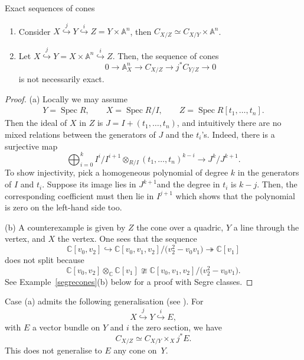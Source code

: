 \documentclass[pdftex]{sigma}
\numberwithin{equation}{section}
\newcommand{\Spec}{\operatorname{Spec}}
\theoremstyle{plain}
\theoremstyle{definition}
\theoremstyle{remark}
\begin{document}
\begin{Example}Exact sequences of cones
\begin{enumerate}\itemsep=0pt
\item[(a)] Consider $X\overset{j}{\hookrightarrow} Y \overset{i}{\hookrightarrow} Z=Y\times\mathbb A^n$, then $C_{X/Z}\simeq C_{X/Y}\times\mathbb A^n$.
\item[(b)] Let $X\overset{j}{\hookrightarrow} Y=X\times\mathbb A^n \overset{i}{\hookrightarrow} Z$. Then, the sequence of cones
\[0\to\mathbb A^n_X\to C_{X/Z}\to j^*C_{Y/Z}\to 0
\] is not necessarily exact.
\end{enumerate}
\end{Example}

\begin{proof}
(a) Locally we may assume
\begin{gather*}Y=\Spec R,\qquad X=\Spec R/I,\qquad Z=\Spec R[t_1,\ldots,t_n].
\end{gather*} Then the ideal of $X$ in $Z$ is $J=I+(t_1,\ldots,t_n)$, and intuitively there are no mixed relations between the generators of $J$ and the $t_i$'s. Indeed, there is a surjective map
\[
 \bigoplus_{i=0}^k I^i/I^{i+1}\otimes_{R/I} (t_1,\ldots,t_n)^{k-i}\to J^k/J^{k+1}.
\]
To show injectivity, pick a homogeneous polynomial of degree $k$ in the generators of $I$ and $t_i$. Suppose its image lies in $J^{k+1}$and the degree in $t_i$ is $k-j$. Then, the corresponding coefficient must then lie in $I^{j+1}$ which shows that the polynomial is zero on the left-hand side too.

(b) A counterexample is given by $Z$ the cone over a quadric, $Y$ a line through the vertex, and $X$ the vertex. One sees that the sequence
\[\mathbb C[v_0,v_2]\hookrightarrow \mathbb C[v_0,v_1,v_2]/\big(v_2^2-v_0v_1\big)\twoheadrightarrow\mathbb C[v_1]\]
does not split because
\[\mathbb C[v_0,v_2]\otimes_{\mathbb C}\mathbb C[v_1]\ncong \mathbb C[v_0,v_1,v_2]/\big(v_2^2-v_0v_1\big).\]
See Example~\ref{segrecones}(b) below for a proof with Segre classes.
\end{proof}

\begin{Remark} Case (a) admits the following generalisation (see \cite[Theorem~6.5]{Fulton}). For
 \[
 X\overset{j}{\hookrightarrow} Y \overset{i}{\hookrightarrow} E,
 \]
 with $E$ a vector bundle on $Y$ and $i$ the zero section, we have
 \[
 C_{X/Z}\simeq C_{X/Y}\times_X j^*E.
 \]
 This does not generalise to $E$ any cone on~$Y$.
\end{Remark}
\end{document}
